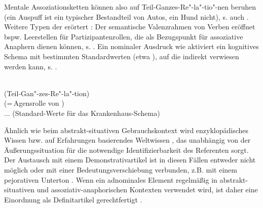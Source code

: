  \begin{exe}
	\ex \label{ex:asso2}   
	\begin{xlist}
		\ex \label{ex:auspuff}  
		\ex \label{ex:hund} 
		\end{xlist}
\end{exe}

Mentale Assoziationsketten können also auf Teil-Ganzes-Re"-la"-tio"-nen beruhen (ein Auspuff ist ein typischer Bestandteil von Autos, ein Hund nicht), s. auch . Weitere Typen der  erörtert \textcite[98--122]{Schwarz2000}: Der semantische Valenzrahmen von Verben eröffnet bspw. Leerstellen für Partizipantenrollen, die als Bezugspunkt für assoziative Anaphern dienen können, s. . Ein nominaler Ausdruck wie  aktiviert ein kognitives Schema mit bestimmten Standardwerten (etwa ), auf die indirekt verwiesen werden kann, s. . 

\begin{exe}
	\ex \label{ex:asso3}   
	\begin{xlist}
		\ex \label{ex:meronymie}  \\  (Teil-Gan"-zes-Re"-la"-tion)
		\ex \label{ex:rolle}  \\  (=\,Agensrolle von ) \object{fordern ein hohes Lösegeld.}
				\ex \label{ex:krank}  \\ ... (Standard-Werte für das Krankenhaus-Schema)
		\end{xlist}
\end{exe}

Ähnlich wie beim abstrakt-situativen Gebrauchskontext wird enzyklopädisches Wissen bzw. auf Erfahrungen basierendes Weltwissen , das unabhängig von der Äußerungssituation für die notwendige Identifizierbarkeit des Referenten sorgt. Der Austausch mit einem Demonstrativartikel ist in diesen Fällen entweder nicht möglich oder mit einer Bedeutungsverschiebung verbunden, z.B. mit einem pejorativen Unterton \parencite[989]{Hauenschild1993}. Wenn ein adnominales Element regelmäßig in abstrakt-situativen und assoziativ-anaphorischen Kontexten verwendet wird, ist daher eine Einordnung als Definitartikel gerechtfertigt \parencite[190]{Himmelmann1997}.

